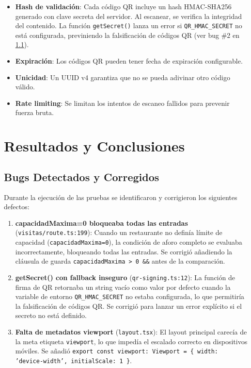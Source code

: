 \begin{itemize}
    \item \textbf{Hash de validación}: Cada código QR incluye un hash HMAC-SHA256 generado con clave secreta del servidor. Al escanear, se verifica la integridad del contenido. La función \texttt{getSecret()} lanza un error si \texttt{QR\_HMAC\_SECRET} no está configurada, previniendo la falsificación de códigos QR (ver bug \#2 en \ref{sec:bugs}).
    \item \textbf{Expiración}: Los códigos QR pueden tener fecha de expiración configurable.
    \item \textbf{Unicidad}: Un UUID v4 garantiza que no se pueda adivinar otro código válido.
    \item \textbf{Rate limiting}: Se limitan los intentos de escaneo fallidos para prevenir fuerza bruta.
\end{itemize}

\section{Resultados y Conclusiones}

\subsection{Bugs Detectados y Corregidos}
\label{sec:bugs}

Durante la ejecución de las pruebas se identificaron y corrigieron los siguientes defectos:

\begin{enumerate}
    \item \textbf{capacidadMaxima=0 bloqueaba todas las entradas} (\texttt{visitas/route.ts:199}): Cuando un restaurante no definía límite de capacidad (\texttt{capacidadMaxima=0}), la condición de aforo completo se evaluaba incorrectamente, bloqueando todas las entradas. Se corrigió añadiendo la cláusula de guarda \texttt{capacidadMaxima > 0 \&\&} antes de la comparación.

    \item \textbf{getSecret() con fallback inseguro} (\texttt{qr-signing.ts:12}): La función de firma de QR retornaba un string vacío como valor por defecto cuando la variable de entorno \texttt{QR\_HMAC\_SECRET} no estaba configurada, lo que permitiría la falsificación de códigos QR. Se corrigió para lanzar un error explícito si el secreto no está definido.

    \item \textbf{Falta de metadatos viewport} (\texttt{layout.tsx}): El layout principal carecía de la meta etiqueta \texttt{viewport}, lo que impedía el escalado correcto en dispositivos móviles. Se añadió \texttt{export const viewport: Viewport = \{ width: 'device-width', initialScale: 1 \}}.
\end{enumerate}

